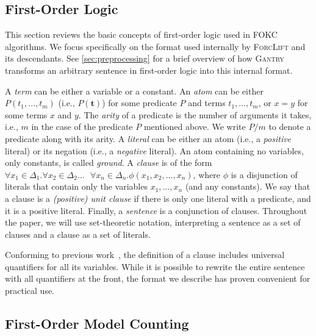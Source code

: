 \documentclass[a4paper,UKenglish,cleveref,autoref,thm-restate]{lipics-v2021}
\newcommand{\Cranetwo}{\textsc{Gantry}}
\begin{document}
\subsection{First-Order Logic}\label{sec:logic}

This section reviews the basic concepts of first-order logic used in FOKC
algorithms. We focus specifically on the format used internally by
\textsc{ForcLift} and its descendants. See \cref{sec:preprocessing} for a brief
overview of how \Cranetwo{} transforms an arbitrary sentence in first-order
logic into this internal format.

A \emph{term} can be either a variable or a constant. An \emph{atom} can be
either $P(t_{1}, \dots, t_{m})$ (i.e., $P(\mathbf{t})$) for some predicate $P$
and terms $t_{1}, \dots, t_{m}$, or $x=y$ for some terms $x$ and $y$. The
\emph{arity} of a predicate is the number of arguments it takes, i.e., $m$ in
the case of the predicate $P$ mentioned above. We write $P/m$ to denote a
predicate along with its arity. A \emph{literal} can be either an atom (i.e., a
\emph{positive} literal) or its negation (i.e., a \emph{negative} literal). An
atom containing no variables, only constants, is called \emph{ground}. A
\emph{clause} is of the form $\forall x_{1} \in \Delta_{1}\text{.
}\forall x_{2} \in \Delta_{2}\dots\text{ }\forall x_{n} \in \Delta_{n}\text{.
}\phi(x_{1}, x_{2}, \dots, x_{n})$, where $\phi$ is a disjunction of literals
that contain only the variables $x_{1}, \dots, x_{n}$ (and any constants). We
say that a clause is a \emph{(positive) unit clause} if there is only one
literal with a predicate, and it is a positive literal. Finally, a
\emph{sentence} is a conjunction of clauses. Throughout the paper, we will use
set-theoretic notation, interpreting a sentence as a set of clauses and a clause
as a set of literals.

\begin{remark*}
  Conforming to previous work~\cite{DBLP:conf/ijcai/BroeckTMDR11}, the
  definition of a clause includes universal quantifiers for all its variables.
  While it is possible to rewrite the entire sentence with all quantifiers at
  the front, the format we describe has proven convenient for practical use.
\end{remark*}

\subsection{First-Order Model Counting}\label{sec:fomc}
\end{document}
